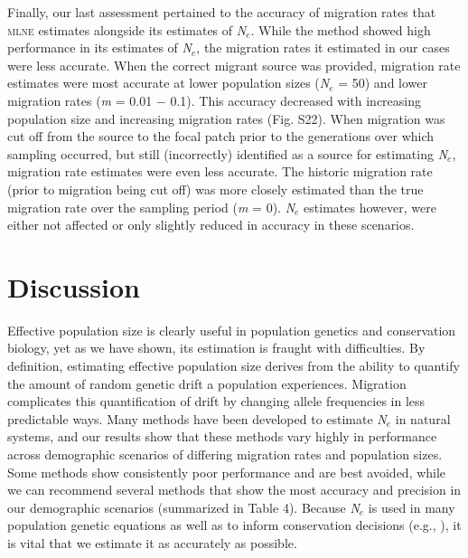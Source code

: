 Finally, our last assessment pertained to the accuracy of migration rates that \textsc{mlne} estimates 
alongside its estimates of \emph{N}$_e$. While the method showed high performance in its estimates of 
\emph{N}$_e$, the migration rates it estimated in our cases were less accurate. When the correct migrant 
source was provided, migration rate estimates were most accurate at lower population sizes (\emph{N}$_e$ = 50) 
and lower migration rates (\emph{m} = 0.01 $-$ 0.1). This accuracy decreased with increasing population size 
and increasing migration rates (Fig. S22). When migration was cut off from the source to the focal patch 
prior to the generations over which sampling occurred, but still (incorrectly) identified as a source for 
estimating \emph{N}$_e$, migration rate estimates were even less accurate. The historic migration rate 
(prior to migration being cut off) was more closely estimated than the true migration rate over the 
sampling period (\emph{m} = 0). \emph{N}$_e$ estimates however, were either not affected or only slightly 
reduced in accuracy in these scenarios.

\section{Discussion}
Effective population size is clearly useful in population genetics and conservation biology, yet as 
we have shown, its estimation is fraught with difficulties. By definition, estimating effective 
population size derives from the ability to quantify the amount of random genetic drift a population 
experiences. Migration complicates this quantification of drift by changing allele frequencies in 
less predictable ways. Many methods have been developed to estimate \emph{N}$_e$ in natural 
systems, and our results show that these methods vary highly in performance across demographic scenarios 
of differing migration rates and population sizes. Some methods show consistently poor performance and 
are best avoided, while we can recommend several methods that show the most accuracy and precision in 
our demographic scenarios (summarized in Table 4). Because \emph{N}$_e$ is used in many population 
genetic equations as well as to inform conservation decisions (e.g., \citealt{Shaffer:1981, Rieman:2001}), it 
is vital that we estimate it as accurately as possible.

